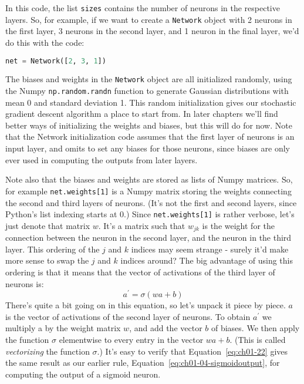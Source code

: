 In this code, the list \lstinline{sizes} contains the number of neurons in the respective layers. So, for example, if we want to create a \lstinline{Network} object with 2 neurons in the first layer, 3 neurons in the second layer, and 1 neuron in the final layer, we'd do this with the code: 
\begin{lstlisting}[language=Python]
net = Network([2, 3, 1])
\end{lstlisting}
The biases and weights in the \lstinline{Network} object are all initialized randomly, using the Numpy \lstinline{np.random.randn} function to generate Gaussian distributions with mean 0 and standard deviation 1. This random initialization gives our stochastic gradient descent algorithm a place to start from. In later chapters we'll find better ways of initializing the weights and biases, but this will do for now. Note that the Network initialization code assumes that the first layer of neurons is an input layer, and omits to set any biases for those neurons, since biases are only ever used in computing the outputs from later layers.

Note also that the biases and weights are stored as lists of Numpy matrices. So, for example \lstinline{net.weights[1]} is a Numpy matrix storing the weights connecting the second and third layers of neurons. (It's not the first and second layers, since Python's list indexing starts at 0.) Since \lstinline{net.weights[1]} is rather verbose, let's just denote that matrix $w$. It's a matrix such that $w_{jk}$ is the weight for the connection between the  neuron in the second layer, and the  neuron in the third layer. This ordering of the $j$ and $k$ indices may seem strange - surely it'd make more sense to swap the $j$ and $k$ indices around? The big advantage of using this ordering is that it means that the vector of activations of the third layer of neurons is: 
\begin{equation}
a^{\prime}=\sigma(w a+b)
\label{eq:ch01-22}
\end{equation}
There's quite a bit going on in this equation, so let's unpack it piece by piece. $a$ is the vector of activations of the second layer of neurons. To obtain $a^\prime$ we multiply a by the weight matrix $w$, and add the vector $b$ of biases. We then apply the function $\sigma$ elementwise to every entry in the vector $wa+b$. (This is called \textit{vectorizing} the function $\sigma$.) It's easy to verify that Equation~\ref{eq:ch01-22} gives the same result as our earlier rule, Equation~\ref{eq:ch01-04-sigmoidoutput}, for computing the output of a sigmoid neuron.

